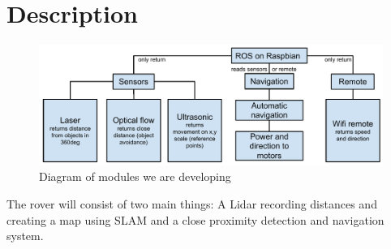 \section{Description}

\begin{figure}[H]
	\centering
	\includegraphics[scale=.7]{images/developmentdiagram.pdf}
	\caption{Diagram of modules we are developing}
	\label{fig:developmentdiagram}
\end{figure}

The rover will consist of two main things: A Lidar recording distances and creating a map using SLAM and a close proximity detection and navigation system.